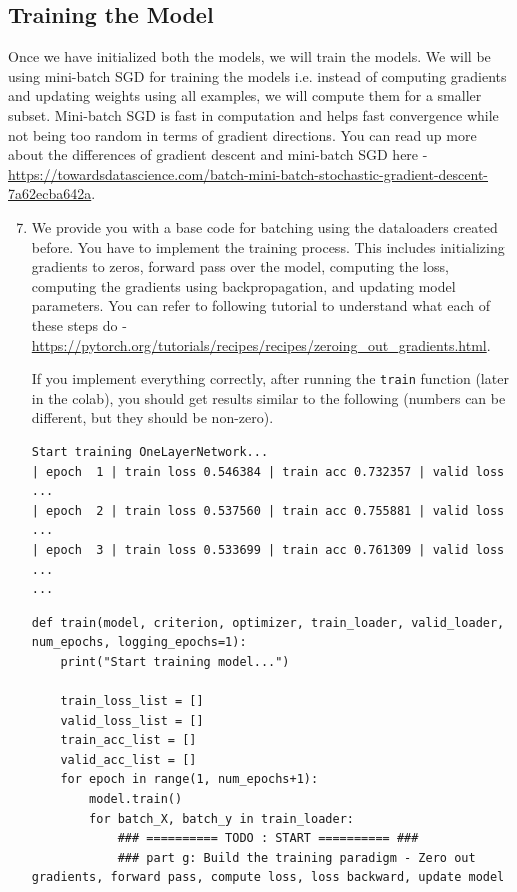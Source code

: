 \subsection{Training the Model }

Once we have initialized both the models, we will train the models. We will be using mini-batch SGD for training the models i.e. instead of computing gradients and updating weights using all examples, we will compute them for a smaller subset. Mini-batch SGD is fast in computation and helps fast convergence while not being too random in terms of gradient directions. You can read up more about the differences of gradient descent and mini-batch SGD here - \url{https://towardsdatascience.com/batch-mini-batch-stochastic-gradient-descent-7a62ecba642a}.

\begin{enumerate}
\setcounter{enumi}{6}

\item {}
We provide you with a base code for batching using the dataloaders created before. You have to implement the training process. This includes initializing gradients to zeros, forward pass over the model, computing the loss, computing the gradients using backpropagation, and updating model parameters. You can refer to following tutorial to understand what each of these steps do - \url{https://pytorch.org/tutorials/recipes/recipes/zeroing_out_gradients.html}.

If you implement everything correctly, after running the \verb|train| function (later in the colab), you should get results similar to the following (numbers can be different, but they should be non-zero). 

\begin{verbatim}
Start training OneLayerNetwork...
| epoch  1 | train loss 0.546384 | train acc 0.732357 | valid loss ...
| epoch  2 | train loss 0.537560 | train acc 0.755881 | valid loss ...
| epoch  3 | train loss 0.533699 | train acc 0.761309 | valid loss ...
...
\end{verbatim}

\begin{verbatim}
def train(model, criterion, optimizer, train_loader, valid_loader, num_epochs, logging_epochs=1):
    print("Start training model...")

    train_loss_list = []
    valid_loss_list = []
    train_acc_list = []
    valid_acc_list = []
    for epoch in range(1, num_epochs+1):
        model.train()
        for batch_X, batch_y in train_loader:
            ### ========== TODO : START ========== ###
            ### part g: Build the training paradigm - Zero out gradients, forward pass, compute loss, loss backward, update model
            

\end{verbatim}
\end{enumerate}
